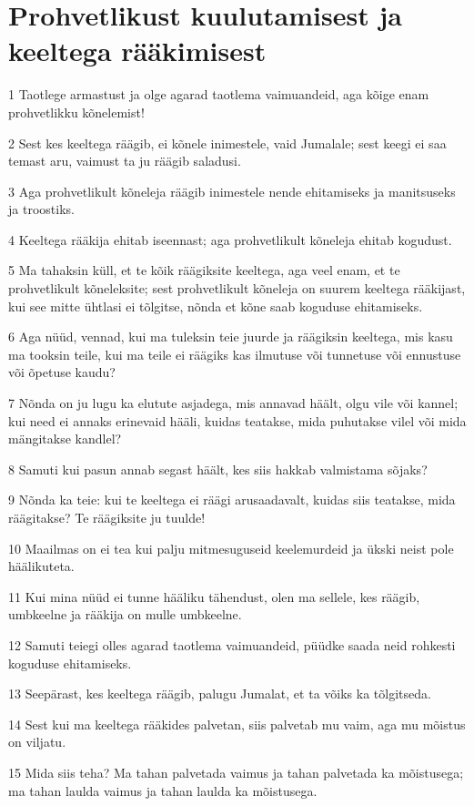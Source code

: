 \section*{Prohvetlikust kuulutamisest ja keeltega rääkimisest}

\par 1 Taotlege armastust ja olge agarad taotlema vaimuandeid, aga kõige enam prohvetlikku kõnelemist!
\par 2 Sest kes keeltega räägib, ei kõnele inimestele, vaid Jumalale; sest keegi ei saa temast aru, vaimust ta ju räägib saladusi.
\par 3 Aga prohvetlikult kõneleja räägib inimestele nende ehitamiseks ja manitsuseks ja troostiks.
\par 4 Keeltega rääkija ehitab iseennast; aga prohvetlikult kõneleja ehitab kogudust.
\par 5 Ma tahaksin küll, et te kõik räägiksite keeltega, aga veel enam, et te prohvetlikult kõneleksite; sest prohvetlikult kõneleja on suurem keeltega rääkijast, kui see mitte ühtlasi ei tõlgitse, nõnda et kõne saab koguduse ehitamiseks.
\par 6 Aga nüüd, vennad, kui ma tuleksin teie juurde ja räägiksin keeltega, mis kasu ma tooksin teile, kui ma teile ei räägiks kas ilmutuse või tunnetuse või ennustuse või õpetuse kaudu?
\par 7 Nõnda on ju lugu ka elutute asjadega, mis annavad häält, olgu vile või kannel; kui need ei annaks erinevaid hääli, kuidas teatakse, mida puhutakse vilel või mida mängitakse kandlel?
\par 8 Samuti kui pasun annab segast häält, kes siis hakkab valmistama sõjaks?
\par 9 Nõnda ka teie: kui te keeltega ei räägi arusaadavalt, kuidas siis teatakse, mida räägitakse? Te räägiksite ju tuulde!
\par 10 Maailmas on ei tea kui palju mitmesuguseid keelemurdeid ja ükski neist pole häälikuteta.
\par 11 Kui mina nüüd ei tunne hääliku tähendust, olen ma sellele, kes räägib, umbkeelne ja rääkija on mulle umbkeelne.
\par 12 Samuti teiegi olles agarad taotlema vaimuandeid, püüdke saada neid rohkesti koguduse ehitamiseks.
\par 13 Seepärast, kes keeltega räägib, palugu Jumalat, et ta võiks ka tõlgitseda.
\par 14 Sest kui ma keeltega rääkides palvetan, siis palvetab mu vaim, aga mu mõistus on viljatu.
\par 15 Mida siis teha? Ma tahan palvetada vaimus ja tahan palvetada ka mõistusega; ma tahan laulda vaimus ja tahan laulda ka mõistusega.
